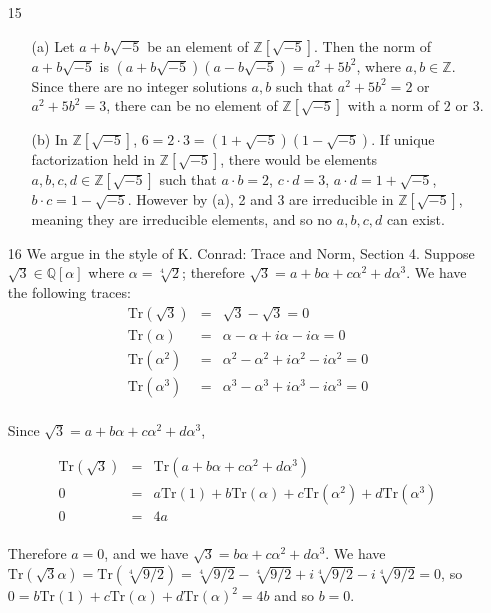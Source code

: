 \documentclass{article}
\newcommand{\zquad}[1]{\mathbb{Z}[\sqrt{#1}]}
\newcommand{\qext}[1]{\mathbb{Q}[#1]}
\newcommand{\trace}[1]{\text{Tr}(#1)}
\begin{document}
\begin{enumerate}
\item[15]
\begin{itemize}
    \item[(a)] Let $a + b\sqrt{-5}$ be an element of $\zquad{-5}$.  Then the norm of $a + b\sqrt{-5}$ is $(a + b\sqrt{-5})(a - b\sqrt{-5}) = a^2 + 5b^2$, where $a, b \in \mathbb{Z}$.  Since there are no integer solutions $a, b$ such that $a^2 + 5b^2 = 2$ or $a^2 + 5b^2 = 3$, there can be no element of $\zquad{-5}$ with a norm of $2$ or $3$.
    \item[(b)] In $\zquad{-5}$, $6 = 2 \cdot 3 = (1 + \sqrt{-5})(1 - \sqrt{-5})$.  If unique factorization held in $\zquad{-5}$, there would be elements $a, b, c, d \in \zquad{-5}$ such that $a \cdot b = 2$, $c \cdot d = 3$, $a \cdot d  =  1 + \sqrt{-5}$, $b \cdot c = 1 - \sqrt{-5}$.
    However by (a), 2 and 3 are irreducible in $\zquad{-5}$, meaning they are irreducible elements, and so no $a, b, c, d$ can exist.
\end{itemize}

\item[16]
We argue in the style of K. Conrad: Trace and Norm, Section 4.  Suppose $\sqrt{3} \in \qext{\alpha}$ where $\alpha = \sqrt[4]{2}$; therefore $\sqrt{3} = a + b\alpha + c\alpha^2 + d\alpha^3$.  We have the following traces:
\begin{eqnarray*}
    \trace{\sqrt{3}} &=& \sqrt{3} - \sqrt{3} = 0 \\
    \trace{\alpha} &=& \alpha - \alpha + i\alpha - i\alpha = 0\\
    \trace{\alpha^2} &=& \alpha^2 - \alpha^2 + i\alpha^2 - i\alpha^2 = 0\\
    \trace{\alpha^3} &=& \alpha^3 - \alpha^3 + i\alpha^3 - i\alpha^3 = 0\\
\end{eqnarray*}

Since $\sqrt{3} = a + b\alpha + c\alpha^2 + d\alpha^3$,

\begin{eqnarray*}
    \trace{\sqrt{3}} &=& \trace{a + b\alpha + c\alpha^2 + d\alpha^3} \\
    0 &=& a\trace{1} + b\trace{\alpha} + c\trace{\alpha^2} + d\trace{\alpha^3} \\
    0 &=& 4a \\
\end{eqnarray*}

Therefore $a = 0$, and we have $\sqrt{3} = b\alpha + c\alpha^2 + d\alpha^3$.  We have $\trace{\sqrt{3}\alpha} = \trace{\sqrt[4]{9/2}} = \sqrt[4]{9/2} - \sqrt[4]{9/2} + i\sqrt[4]{9/2} - i\sqrt[4]{9/2} = 0$, so $0 = b\trace{1} + c\trace{\alpha} + d\trace{\alpha}^2 = 4b$ and so $b = 0$.


\end{enumerate}
\end{document}
